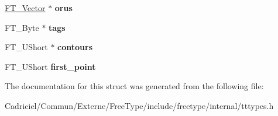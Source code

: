 \begin{DoxyCompactItemize}
\item 
\hyperlink{struct_f_t___vector__}{F\+T\+\_\+\+Vector} $\ast$ {\bfseries orus}\hypertarget{struct_t_t___glyph_zone_rec___a4b4193dbae177435cb6515f9a0537fa0}{}\label{struct_t_t___glyph_zone_rec___a4b4193dbae177435cb6515f9a0537fa0}

\item 
F\+T\+\_\+\+Byte $\ast$ {\bfseries tags}\hypertarget{struct_t_t___glyph_zone_rec___ae816c5c1096e333741d3f3f9d3ae0a8f}{}\label{struct_t_t___glyph_zone_rec___ae816c5c1096e333741d3f3f9d3ae0a8f}

\item 
F\+T\+\_\+\+U\+Short $\ast$ {\bfseries contours}\hypertarget{struct_t_t___glyph_zone_rec___ad16498cac0d4d233dce009eb74d63de1}{}\label{struct_t_t___glyph_zone_rec___ad16498cac0d4d233dce009eb74d63de1}

\item 
F\+T\+\_\+\+U\+Short {\bfseries first\+\_\+point}\hypertarget{struct_t_t___glyph_zone_rec___a9d655be80b3e31652f69ede54458faaf}{}\label{struct_t_t___glyph_zone_rec___a9d655be80b3e31652f69ede54458faaf}

\end{DoxyCompactItemize}


The documentation for this struct was generated from the following file\+:\begin{DoxyCompactItemize}
\item 
Cadriciel/\+Commun/\+Externe/\+Free\+Type/include/freetype/internal/tttypes.\+h\end{DoxyCompactItemize}
